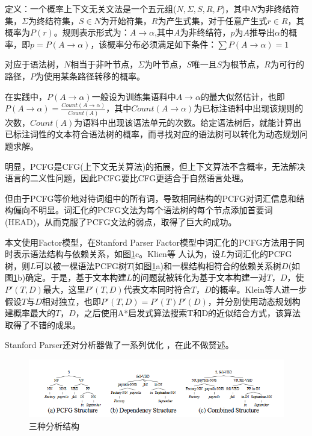 定义：一个概率上下文无关文法是一个五元组($N,\Sigma ,S,R,P$)，其中$N$为非终结符集，$\Sigma$为终结符集，$S\in N$为开始符集，$R$为产生式集，对于任意产生式$r \in R$，其概率为$P(r)$。规则表示形式为：$A\rightarrow\alpha$,其中$A$为非终结符，$p$为$A$推导出$\alpha$的概率，即$p = P(A\rightarrow\alpha)$，该概率分布必须满足如下条件：$\sum{P(A\rightarrow\alpha)}=1$
\cite{Cha93}\par
对应于语法树，$N$相当于非叶节点，$\Sigma$为叶节点，$S$唯一且$S$为根节点，$R$为可行的路径，$P$为使用某条路径转移的概率。\par
在实践中，$P(A\rightarrow\alpha)$一般设为训练集语料中$A\rightarrow\alpha$的最大似然估计，也即$P(A\rightarrow\alpha) = \frac{Count(A\rightarrow\alpha)}{Count(A)}$，其中$Count(A\rightarrow\alpha)$为已标注语料中出现该规则的次数，$Count(A)$为语料中出现该语法单元的次数。给定语法树后，就能计算出已标注词性的文本符合语法树的概率，而寻找对应的语法树可以转化为动态规划问题求解。\par
明显，PCFG是CFG(上下文无关算法)的拓展，但上下文算法不含概率，无法解决语言的二义性问题，因此PCFG要比CFG更适合于自然语言处理。\par
但由于PCFG等价地对待词组中的所有词，导致相同结构的PCFG对词汇信息和结构偏向不明显。词汇化的PCFG文法为每个语法树的每个节点添加首要词(HEAD)，从而克服了PCFG文法的弱点，取得了巨大的成功\cite{Klein2003b}。\par
本文使用Factor模型，在Stanford Parser Factor模型中词汇化的PCFG方法用于同时表示语法结构与依赖关系，如图\ref{parser1}c。Klien等\cite{Klein2003a} 人认为，设$L$为词汇化的PCFG树，则$L$可以被一棵语法PCFG树$T$(如图\ref{parser1}a)和一棵结构相符合的依赖关系树$D$(如图\ref{parser1}b)确定。于是，基于文本构建$L$的问题就被转化为基于文本构建一对$T$，$D$，使$P'(T,D)$最大，这里$P'(T,D)$代表文本同时符合$T$，$D$的概率。Klein等人进一步假设$T$与$D$相对独立，也即$P'(T,D) = P'(T)P'(D)$，并分别使用动态规划构建概率最大的$T$，$D$，之后使用A*启发式算法搜索T和D的近似结合方式，该算法取得了不错的成果。\par
Stanford Parser还对分析器做了一系列优化\cite{LevyM03} \cite{Marneffe06} \cite{Zhang2011} \cite{ChenM14} \cite{SocherBMN13} \cite{Nivre16} \cite{SchusterM16}，在此不做赘述。
\begin{figure}
\begin{center}
\includegraphics[width=\textwidth]{graphic/parser1.PNG}
\caption{三种分析结构 \label{parser1}}
\end{center}
\end{figure}
